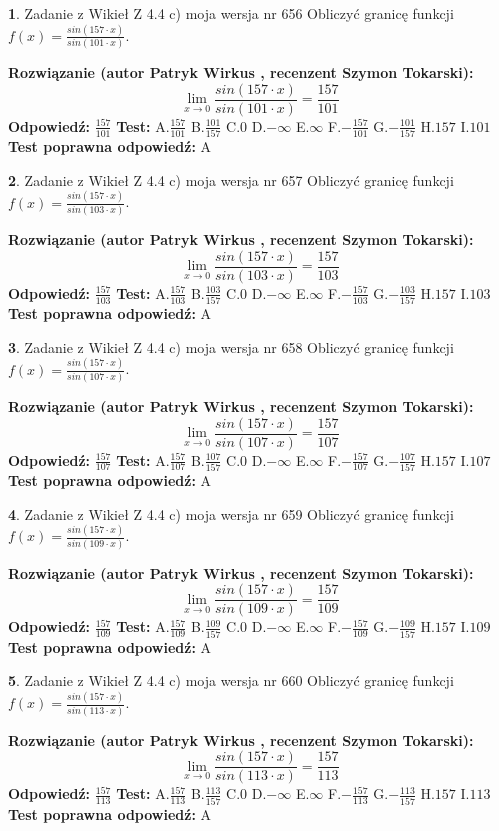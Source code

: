 \documentclass[12pt, a4paper]{article}
\theoremstyle{definition} %
\newtheorem{zad}{}
\newcommand{\zadStart}[1]{\begin{zad}#1\newline}
\newcommand{\zadStop}{\end{zad}}
\newcommand{\rozwStart}[2]{\noindent \textbf{Rozwiązanie (autor #1 , recenzent #2): }\newline}
\newcommand{\rozwStop}{\newline}
\newcommand{\odpStart}{\noindent \textbf{Odpowiedź:}\newline}
\newcommand{\odpStop}{\newline}
\newcommand{\testStart}{\noindent \textbf{Test:}\newline}
\newcommand{\testStop}{\newline}
\newcommand{\kluczStart}{\noindent \textbf{Test poprawna odpowiedź:}\newline}
\newcommand{\kluczStop}{\newline}
\begin{document}
\zadStart{Zadanie z Wikieł Z 4.4 c) moja wersja nr 656}
Obliczyć granicę funkcji $f(x)=\frac{sin(157\cdot x)}{sin(101\cdot x)}$.
\zadStop
\rozwStart{Patryk Wirkus}{Szymon Tokarski}
$$\lim\limits_{x\to 0}\frac{sin(157\cdot x)}{sin(101\cdot x)}=
\frac{157}{101}$$
\rozwStop
\odpStart
$\frac{157}{101}$
\odpStop
\testStart
A.$\frac{157}{101}$
B.$\frac{101}{157}$
C.$0$
D.$-\infty$
E.$\infty$
F.$-\frac{157}{101}$
G.$-\frac{101}{157}$
H.$157$
I.$101$
\testStop
\kluczStart
A
\kluczStop



\zadStart{Zadanie z Wikieł Z 4.4 c) moja wersja nr 657}
Obliczyć granicę funkcji $f(x)=\frac{sin(157\cdot x)}{sin(103\cdot x)}$.
\zadStop
\rozwStart{Patryk Wirkus}{Szymon Tokarski}
$$\lim\limits_{x\to 0}\frac{sin(157\cdot x)}{sin(103\cdot x)}=
\frac{157}{103}$$
\rozwStop
\odpStart
$\frac{157}{103}$
\odpStop
\testStart
A.$\frac{157}{103}$
B.$\frac{103}{157}$
C.$0$
D.$-\infty$
E.$\infty$
F.$-\frac{157}{103}$
G.$-\frac{103}{157}$
H.$157$
I.$103$
\testStop
\kluczStart
A
\kluczStop



\zadStart{Zadanie z Wikieł Z 4.4 c) moja wersja nr 658}
Obliczyć granicę funkcji $f(x)=\frac{sin(157\cdot x)}{sin(107\cdot x)}$.
\zadStop
\rozwStart{Patryk Wirkus}{Szymon Tokarski}
$$\lim\limits_{x\to 0}\frac{sin(157\cdot x)}{sin(107\cdot x)}=
\frac{157}{107}$$
\rozwStop
\odpStart
$\frac{157}{107}$
\odpStop
\testStart
A.$\frac{157}{107}$
B.$\frac{107}{157}$
C.$0$
D.$-\infty$
E.$\infty$
F.$-\frac{157}{107}$
G.$-\frac{107}{157}$
H.$157$
I.$107$
\testStop
\kluczStart
A
\kluczStop



\zadStart{Zadanie z Wikieł Z 4.4 c) moja wersja nr 659}
Obliczyć granicę funkcji $f(x)=\frac{sin(157\cdot x)}{sin(109\cdot x)}$.
\zadStop
\rozwStart{Patryk Wirkus}{Szymon Tokarski}
$$\lim\limits_{x\to 0}\frac{sin(157\cdot x)}{sin(109\cdot x)}=
\frac{157}{109}$$
\rozwStop
\odpStart
$\frac{157}{109}$
\odpStop
\testStart
A.$\frac{157}{109}$
B.$\frac{109}{157}$
C.$0$
D.$-\infty$
E.$\infty$
F.$-\frac{157}{109}$
G.$-\frac{109}{157}$
H.$157$
I.$109$
\testStop
\kluczStart
A
\kluczStop



\zadStart{Zadanie z Wikieł Z 4.4 c) moja wersja nr 660}
Obliczyć granicę funkcji $f(x)=\frac{sin(157\cdot x)}{sin(113\cdot x)}$.
\zadStop
\rozwStart{Patryk Wirkus}{Szymon Tokarski}
$$\lim\limits_{x\to 0}\frac{sin(157\cdot x)}{sin(113\cdot x)}=
\frac{157}{113}$$
\rozwStop
\odpStart
$\frac{157}{113}$
\odpStop
\testStart
A.$\frac{157}{113}$
B.$\frac{113}{157}$
C.$0$
D.$-\infty$
E.$\infty$
F.$-\frac{157}{113}$
G.$-\frac{113}{157}$
H.$157$
I.$113$
\testStop
\kluczStart
A
\kluczStop
\end{document}
